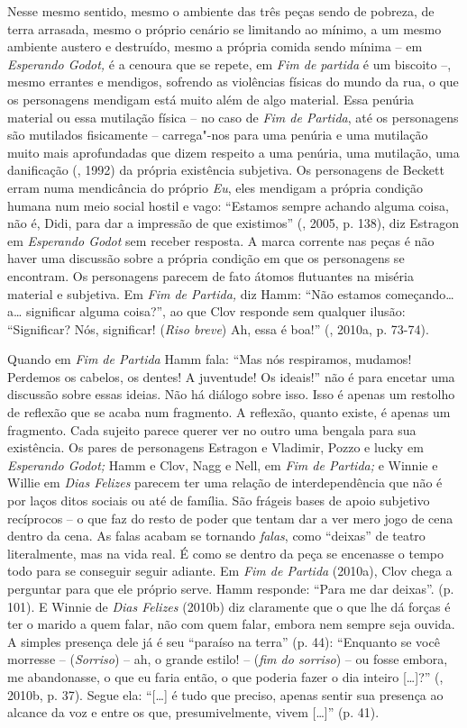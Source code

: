 {Nesse mesmo sentido, mesmo o ambiente das três peças sendo de pobreza,
de terra arrasada, mesmo o próprio cenário se limitando ao mínimo, a um
mesmo ambiente austero e destruído, mesmo a própria comida sendo mínima
-- em \emph{Esperando Godot,} é a cenoura que se repete, em \emph{Fim de
partida} é um biscoito --, mesmo errantes e mendigos, sofrendo as
violências físicas do mundo da rua, o que os personagens mendigam está
muito além de algo material. Essa penúria material ou essa mutilação
física -- no caso de \emph{Fim de Partida}, até os personagens são
mutilados fisicamente -- carrega"-nos para uma penúria e uma mutilação
muito mais aprofundadas que dizem respeito a uma penúria, uma mutilação,
uma danificação (, 1992) da própria existência subjetiva. Os
personagens de Beckett erram numa mendicância do próprio \emph{Eu}, eles
mendigam a própria condição humana num meio social hostil e vago:
``Estamos sempre achando alguma coisa, não é, Didi, para dar a impressão
de que existimos'' (, 2005, p. 138), diz Estragon em
\emph{Esperando Godot} sem receber resposta. A marca corrente nas peças
é não haver uma discussão sobre a própria condição em que os personagens
se encontram. Os personagens parecem de fato átomos flutuantes na
miséria material e subjetiva. Em \emph{Fim de Partida,} diz Hamm: ``Não
estamos começando\ldots{} a\ldots{} significar alguma coisa?'', ao que Clov
responde sem qualquer ilusão: ``Significar? Nós, significar! (\emph{Riso
breve}) Ah, essa é boa!'' (, 2010a, p. 73-74).

Quando em \emph{Fim de Partida} Hamm fala: ``Mas nós respiramos,
mudamos! Perdemos os cabelos, os dentes! A juventude! Os ideais!'' não é
para encetar uma discussão sobre essas ideias. Não há diálogo sobre
isso. Isso é apenas um restolho de reflexão que se acaba num fragmento.
A reflexão, quanto existe, é apenas um fragmento. Cada sujeito parece
querer ver no outro uma bengala para sua existência. Os pares de
personagens Estragon e Vladimir, Pozzo e lucky em \emph{Esperando
Godot;} Hamm e Clov, Nagg e Nell, em \emph{Fim de Partida;} e Winnie e
Willie em \emph{Dias Felizes} parecem ter uma relação de
interdependência que não é por laços ditos sociais ou até de família.
São frágeis bases de apoio subjetivo recíprocos -- o que faz do resto de
poder que tentam dar a ver mero jogo de cena dentro da cena. As falas
acabam se tornando \emph{falas}, como ``deixas'' de teatro literalmente,
mas na vida real. É como se dentro da peça se encenasse o tempo todo
para se conseguir seguir adiante. Em \emph{Fim de Partida} (2010a), Clov
chega a perguntar para que ele próprio serve. Hamm responde: ``Para me
dar deixas''. (p. 101). E Winnie de \emph{Dias Felizes} (2010b) diz
claramente que o que lhe dá forças é ter o marido a quem falar, não com
quem falar, embora nem sempre seja ouvida. A simples presença dele já é
seu ``paraíso na terra'' (p. 44): ``Enquanto se você morresse --
(\emph{Sorriso}) -- ah, o grande estilo! -- (\emph{fim do sorriso}) --
ou fosse embora, me abandonasse, o que eu faria então, o que poderia
fazer o dia inteiro [\ldots{}]?'' (, 2010b, p. 37). Segue
ela: ``[\ldots{}] é tudo que preciso, apenas sentir sua presença ao
alcance da voz e entre os que, presumivelmente, vivem [\ldots{}]'' (p.
41).

}
